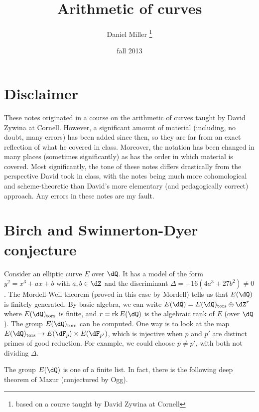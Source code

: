 \documentclass{article}
\title{Arithmetic of curves}
\author{Daniel Miller
  \thanks{based on a course taught by David Zywina at Cornell}}
\date{fall 2013}
\begin{document}
\maketitle
\tableofcontents





\newpage
\section*{Disclaimer}

These notes originated in a course on the arithmetic of curves taught by David 
Zywina at Cornell. However, a significant amount of material (including, no 
doubt, many errors) has been added since then, so they are far from an exact 
reflection of what he covered in class. Moreover, the notation has been changed 
in many places (sometimes significantly) as has the order in which material is 
covered. Most significantly, the tone of these notes differs drastically 
from the perspective David took in class, with the notes being much more 
cohomological and scheme-theoretic than David's more elementary (and 
pedagogically correct) approach. Any errors in these notes are my fault. 













\section{Birch and Swinnerton-Dyer conjecture}

Consider an elliptic curve $E$ over $\dQ$. It has a model of the form 
$y^2=x^3+a x+b$ with $a,b\in \dZ$ and the discriminant 
$\Delta=-16(4 a^3+27 b^2)\ne 0$. The Mordell-Weil theorem (proved in this case 
by Mordell) tells us that $E(\dQ)$ is finitely generated. By basic algebra, 
we can write $E(\dQ) = E(\dQ)_\text{tors}\oplus \dZ^r$ where 
$E(\dQ)_\text{tors}$ is finite, and $r=\rank E(\dQ)$ is the algebraic rank of 
$E$ (over $\dQ$). The group $E(\dQ)_\text{tors}$ can be computed. One way is to 
look at the map $E(\dQ)_\text{tors}\to E(\dF_p)\times E(\dF_{p'})$, which is 
injective when $p$ and $p'$ are distinct primes of good reduction. For 
example, we could choose $p\ne p'$, with both not dividing $\Delta$. 

The group $E(\dQ)$ is one of a finite list. In fact, there is the following 
deep theorem of Mazur (conjectured by Ogg).
\end{document}
